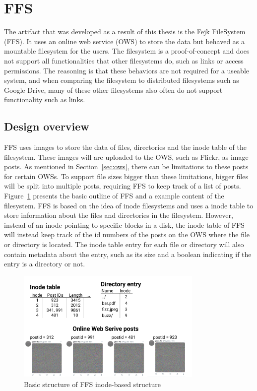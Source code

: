 \section{FFS}
The artifact that was developed as a result of this thesis is the Fejk FileSystem (FFS). It uses an online web service (\gls{OWS}) to store the data but behaved as a mountable filesystem for the users. The filesystem is a proof-of-concept and does not support all functionalities that other filesystems do, such as links or access permissions. The reasoning is that these behaviors are not required for a useable system, and when comparing the filesystem to distributed filesystems such as Google Drive, many of these other filesystems also often do not support functionality such as links.

\subsection{Design overview}
FFS uses images to store the data of files, directories and the inode table of the filesystem. These images will are uploaded to the OWS, such as Flickr, as image posts. As mentioned in Section~\ref{sec:ows}, there can be limitations to these posts for certain OWSs. To support file sizes bigger than these limitations, bigger files will be split into multiple posts, requiring FFS to keep track of a list of posts. Figure~\ref{fig:ffs_inode_diag} presents the basic outline of FFS and a example content of the filesystem. FFS is based on the idea of inode filesystems and uses a inode table to store information about the files and directories in the filesystem. However, instead of an inode pointing to specific blocks in a disk, the inode table of FFS will instead keep track of the id numbers of the posts on the OWS where the file or directory is located. The inode table entry for each file or directory will also contain metadata about the entry, such as its size and a boolean indicating if the entry is a directory or not.

\begin{figure}[!ht]
	\begin{center}
	  \includegraphics[width=0.8\textwidth]{figures/ffs_inode_diagram.png}
	\end{center}
	\caption{Basic structure of FFS inode-based structure}
	\label{fig:ffs_inode_diag}
\end{figure}


